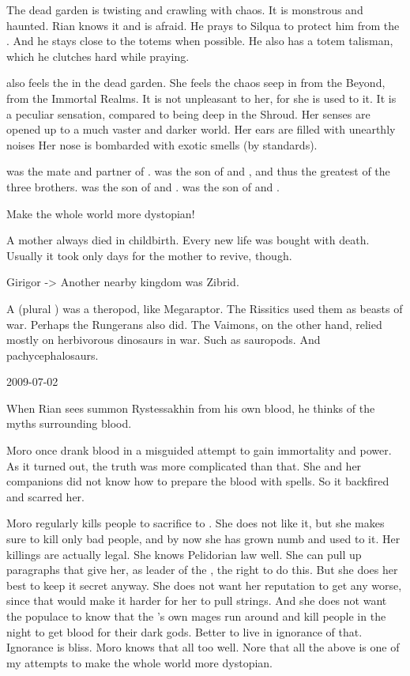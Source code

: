 The dead garden is twisting and crawling with chaos.
It is monstrous and haunted.
Rian knows it and is afraid.
He prays to Silqua to protect him from the \wylde.
And he stays close to the totems when possible.
He also has a totem talisman, which he clutches hard while praying.

\Criseis also feels the \wylde in the dead garden.
She feels the chaos seep in from the Beyond, from the Immortal Realms.
It is not unpleasant to her, for she is used to it.
It is a peculiar sensation, compared to being deep in the Shroud.
Her senses are opened up to a much vaster and darker world.
Her ears are filled with unearthly noises
Her nose is bombarded with exotic smells (by \Azmithian standards).

\Tiamat was the mate and partner of \Sethicus.
\Nexagglachel was the son of \Tiamat and \Sethicus, and thus the greatest of the three brothers.
\Ishnaruchaefir was the son of \Tiamat and \Iurzmacul.
\Secherdamon was the son of \Tiamat and \ApepNesthra.

Make the whole world more dystopian!

A \resvil mother always died in childbirth.
Every new \resphan life was bought with death.
Usually it took only days for the mother to revive, though.

Girigor -> \Numah
Another nearby \nephil kingdom was Zibrid.

A \lotha (plural \lothae) was a theropod, like Megaraptor.
The Rissitics used them as beasts of war. 
Perhaps the Rungerans also did.
The Vaimons, on the other hand, relied mostly on herbivorous dinosaurs in war.
Such as sauropods.
And pachycephalosaurs.



2009-07-02

When Rian sees \Ishnaruchaefir summon Rystessakhin from his own blood, he thinks of the myths surrounding \dragon blood.

Moro once drank \dragon blood in a misguided attempt to gain immortality and power.
As it turned out, the truth was more complicated than that.
She and her companions did not know how to prepare the \dragon blood with spells.
So it backfired and scarred her.

Moro regularly kills people to sacrifice to \Nasshikerr.
She does not like it, but she makes sure to kill only bad people, and by now she has grown numb and used to it.
Her killings are actually legal.
She knows Pelidorian law well. 
She can pull up paragraphs that give her, as leader of the \ishrah, the right to do this.
But she does her best to keep it secret anyway.
She does not want her reputation to get any worse, since that would make it harder for her to pull strings.
And she does not want the populace to know that the \rayuth's own \ishrah mages run around and kill people in the night to get blood for their dark gods.
Better to live in ignorance of that.
Ignorance is bliss.
Moro knows that all too well.
Nore that all the above is one of my attempts to make the whole world more dystopian.

